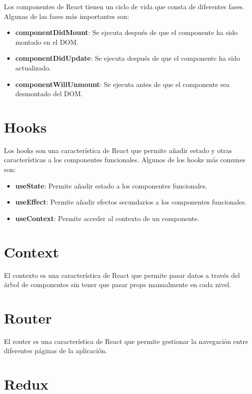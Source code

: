 \documentclass[
  a4paper,
  DIV=11,
  numbers=noendperiod,
  onepage,
  openany]{scrreprt}
\providecommand{\tightlist}{%
  \setlength{\itemsep}{0pt}\setlength{\parskip}{0pt}}\usepackage{longtable,booktabs,array}
\begin{document}
\begin{tcolorbox}
Los componentes de React tienen un ciclo de vida que consta de
diferentes fases. Algunas de las fases más importantes son:

\begin{itemize}
\tightlist
\item
  \textbf{componentDidMount}: Se ejecuta después de que el componente ha
  sido montado en el DOM.
\item
  \textbf{componentDidUpdate}: Se ejecuta después de que el componente
  ha sido actualizado.
\item
  \textbf{componentWillUnmount}: Se ejecuta antes de que el componente
  sea desmontado del DOM.
\end{itemize}

\section{Hooks}\label{hooks}

Los hooks son una característica de React que permite añadir estado y
otras características a los componentes funcionales. Algunos de los
hooks más comunes son:

\begin{itemize}
\tightlist
\item
  \textbf{useState}: Permite añadir estado a los componentes
  funcionales.
\item
  \textbf{useEffect}: Permite añadir efectos secundarios a los
  componentes funcionales.
\item
  \textbf{useContext}: Permite acceder al contexto de un componente.
\end{itemize}

\section{Context}\label{context}

El contexto es una característica de React que permite pasar datos a
través del árbol de componentes sin tener que pasar props manualmente en
cada nivel.

\section{Router}\label{router}

El router es una característica de React que permite gestionar la
navegación entre diferentes páginas de la aplicación.

\section{Redux}\label{redux}


\end{tcolorbox}
\end{document}
